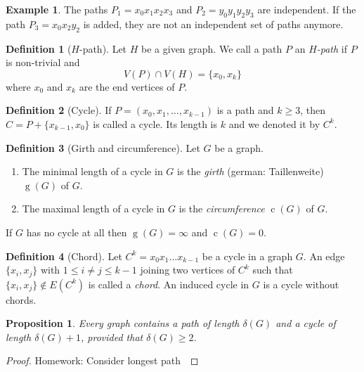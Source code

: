 \documentclass[a4paper]{article}
\theoremstyle{definition}\newtheorem*{defi*}{Definition}
\theoremstyle{remark}\newtheorem*{rem}{Remark}
\theoremstyle{plain}\newtheorem{lemma}[cnt]{Lemma}
\theoremstyle{definition}\newtheorem*{ex}{Example}
\theoremstyle{definition}\newtheorem*{exs}{Examples}
\theoremstyle{plain}\newtheorem{theorem}[cnt]{Theorem}
\theoremstyle{plain}\newtheorem{prop}[cnt]{Proposition}
\theoremstyle{plain}\newtheorem*{cor*}{Corollary}
\theoremstyle{definition}\newtheorem{nota}{Notation}
\theoremstyle{definition}\newtheorem*{nota*}{Notation}
\theoremstyle{plain}\newtheorem{conj}[cnt]{Conjecture}
\DeclareMathOperator{\girth}{g}
\DeclareMathOperator{\circum}{c}
\begin{document}
\begin{ex}
  The paths $P_1 = x_0 x_1 x_2 x_3$ and $P_2 = y_0 y_1 y_2 y_3$ are independent. If the path $P_3 = x_0 x_2 y_2$ is added, they are not an independent set of paths anymore.
\end{ex}

\begin{defi*}[$H$-path]
  Let $H$ be a given graph. We call a path $P$ an \emph{$H$-path} if $P$ is non-trivial and
  \[ V(P) \cap V(H) = \{x_0,x_k\} \]
  where $x_0$ and $x_k$ are the end vertices of $P$.
\end{defi*}

\begin{defi*}[Cycle]
  If $P = (x_0,x_1,\dots,x_{k-1})$ is a path and $k \geq 3$, then $C = P + \{x_{k-1},x_{0} \}$ is called a cycle.
  Its length is $k$ and we denoted it by $C^k$.
\end{defi*}

\begin{defi*}[Girth and circumference]
  Let $G$ be a graph.
  \begin{enumerate}[label=(\alph*)]
    \item The minimal length of a cycle in $G$ is the \emph{girth} (german: Taillenweite) $\girth(G)$ of $G$.
    \item The maximal length of a cycle in $G$ is the \emph{circumference} $\circum(G)$  of $G$.
  \end{enumerate}
  If $G$ has no cycle at all then $\girth(G) = \infty$ and $\circum(G) = 0$.\\
\end{defi*}

\begin{defi*}[Chord]
  Let $C^k = x_0 x_1 \dots x_{k-1}$ be a cycle in a graph $G$.
  An edge $\{x_i,x_j\}$ with $1 \leq i \neq j \leq k-1$ joining two vertices of $C^k$ such that $\{x_i,x_j\} \notin E(C^k)$ is called a \emph{chord}.
  An induced cycle in $G$ is a cycle without chords.
\end{defi*}

\begin{prop}
  Every graph contains a path of length $\delta(G)$ and a cycle of length $\delta(G) +1$, provided that $\delta(G) \geq 2$.
\end{prop}

\begin{proof}
  Homework: Consider longest path\
\end{proof}
\end{document}
